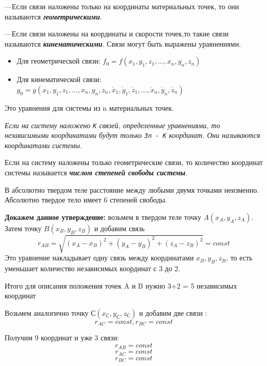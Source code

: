 ---Если связи наложены только на координаты материальных точек, то они называются \textbf{\textit{геометрическими}}.

\vspace{5px}

---Если связи наложены на координаты и скорости точек,то такие связи называются \textbf{\textit{кинематическими}}. Связи могут быть выражены уравнениями.
\begin{itemize}
    \item Для геометрической связи: $f_0 = f(x_1,y_1,z_1, \dots , x_n, y_n, z_n)$
    \item Для кинематической связи: $g_0 = g(x_1,y_1,z_1, \dots , x_n, y_n, z_n, \dot x_1,\dot y_1,\dot z_1, \dots , \dot x_n, \dot y_n,\dot z_n)$
\end{itemize}
Это уравнения для системы из n материальных точек.

\vspace{5px}

 \textit{Если на систему наложено \texttt{К} связей, определенные уравнениями, то независимыми координатами будут только \texttt{3n - K} координат. Они называются координатами системы.}

\vspace{5px}

 Если на систему наложены только геометрические связи, то количество координат системы называется \textbf{\textit{числом степеней свободы системы}}.

\vspace{5px}

В абсолютно твердом теле расстояние между любыми двумя точками неизменно. Абсолютно твердое тело имеет 6 степеней свободы.

\vspace{6px}

\textbf{Докажем данное утверждение:} возьмем в твердом теле точку $ A(x_A,y_A,z_A)$. Затем точку $ B(x_{B},y_{B},z_{B})$ и добавим связь \[ r_{AB} = \sqrt{(x_A-x_B)^2 + (y_A-y_B)^2 + (z_A-z_B)^2} = const \]
Это уравнение накладывает одну связь между координатами $x_B, y_B,z_B$, то есть уменьшает количество независимых координат с 3 до 2.

Итого для описания положения точек A и B нужно 3+2 = 5 независимых координат

Возьмем аналогично точку $ С(x_{С},y_{С},z_{С})$ и добавим две связи : \[ r_{AC} = const, r_{BC} = const \]

Получим 9 координат и уже 3 связи:
\[r_{AB} = const\]
\[r_{AC} = const\]
\[r_{BC} = const\]

